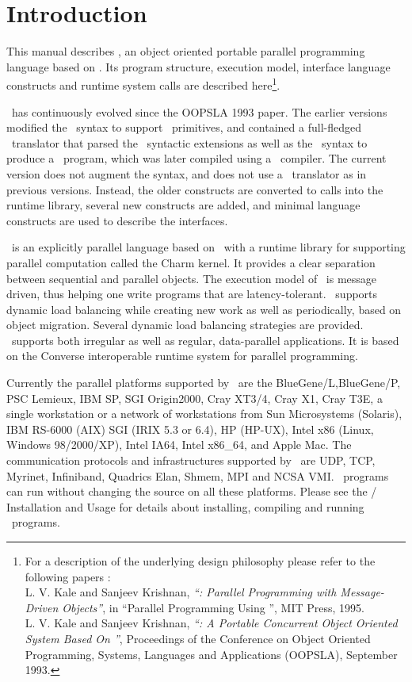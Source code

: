 \section{Introduction}

This manual describes \charmpp, an object oriented portable parallel
programming language based on \CC. Its program structure, execution
model, interface language constructs and runtime system calls are
described here\footnote{For a description of the underlying design
philosophy please refer to the following papers :\\
    L. V. Kale and Sanjeev Krishnan,
    {\em ``\charmpp : Parallel Programming with Message-Driven Objects''},
    in ``Parallel Programming Using \CC'',
    MIT Press, 1995. \\
    L. V. Kale and Sanjeev Krishnan,
    {\em ``\charmpp : A Portable Concurrent Object Oriented System
    Based On \CC''},
    Proceedings of the Conference on Object Oriented Programming,
    Systems, Languages and Applications (OOPSLA), September 1993.
}.

\charmpp\ has continuously evolved since the OOPSLA 1993 paper.  The earlier
versions modified the \CC\ syntax to support \charmpp\ primitives, and
contained a full-fledged \charmpp\ translator that parsed the \charmpp\
syntactic extensions as well as the \CC\ syntax to produce a \CC\ program,
which was later compiled using a \CC\ compiler.  The current version does not
augment the \CC{} syntax, and does not use a \charmpp\ translator as in previous
versions. Instead, the older constructs are converted to calls into the runtime
library, several new constructs are added, and minimal language constructs are
used to describe the interfaces.

\charmpp\ is an explicitly parallel language based on \CC\ with a runtime
library for supporting parallel computation called the Charm kernel.  It
provides a clear separation between sequential and parallel objects.  The
execution model of \charmpp\ is message driven, thus helping one write programs
that are latency-tolerant.  \charmpp\ supports dynamic load balancing while
creating new work as well as periodically, based on object migration.  Several
dynamic load balancing strategies are provided.  \charmpp\ supports both
irregular as well as regular, data-parallel applications.  It is based on the
{\sc Converse} interoperable runtime system for parallel programming.

Currently the parallel platforms supported by \charmpp\ are the BlueGene/L,BlueGene/P, PSC
Lemieux, IBM SP, SGI Origin2000, Cray XT3/4, Cray X1, Cray T3E, a single workstation or a
network of workstations from Sun Microsystems (Solaris), IBM RS-6000 (AIX) SGI
(IRIX 5.3 or 6.4), HP (HP-UX), Intel x86 (Linux, Windows 98/2000/XP), Intel
IA64, Intel x86\_64, and Apple Mac. The communication protocols and infrastructures supported
by \charmpp\ are UDP, TCP, Myrinet, Infiniband, Quadrics Elan, Shmem, MPI and
NCSA VMI.  \charmpp\ programs can run without changing the source on all these
platforms.  Please see the \charmpp{}/\converse{} Installation and
Usage 
for details about installing, compiling and running \charmpp\ programs.

